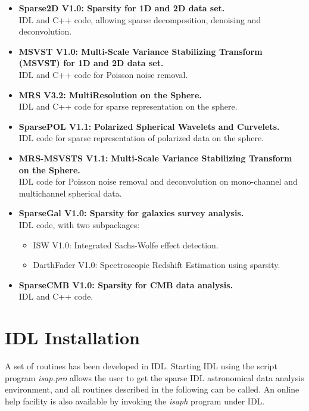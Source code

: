 \begin{itemize}
 \item{\Large \bf  {Sparse2D V1.0: }} {  \bf  {Sparsity for 1D and 2D data set. }} \\
 IDL and C++ code, allowing sparse decomposition, denoising and deconvolution.

 \item{\Large \bf  {MSVST V1.0: }} {  \bf  {Multi-Scale Variance Stabilizing Transform (MSVST) for 1D and 2D data set.}} \\
 IDL and C++ code for Poisson noise removal.
 
 \item{\Large \bf  {MRS V3.2: }} {  \bf  {MultiResolution on the Sphere.}} \\
  IDL and C++ code for sparse representation on the sphere.

 \item {\Large \bf  {SparsePOL V1.1:}}   {  \bf  {Polarized Spherical Wavelets and Curvelets.}}  \\
 IDL code for sparse representation of polarized data on the sphere.
 
 \item {\Large \bf {MRS-MSVSTS   V1.1:}}  { \bf  {Multi-Scale Variance Stabilizing Transform on the Sphere.}} \\
  IDL code for Poisson noise removal and deconvolution on mono-channel and multichannel spherical data.

  \item{\Large \bf  {SparseGal V1.0: }} {  \bf  {Sparsity for galaxies survey analysis.}} \\
 IDL code, with two subpackages:
 \begin{itemize}
 \item ISW V1.0:  Integrated Sachs-Wolfe effect detection.
 \item DarthFader V1.0: Spectroscopic Redshift Estimation using sparsity.
 \end{itemize}
  \item{\Large \bf  {SparseCMB V1.0: }} {  \bf  {Sparsity for CMB data analysis.}}  \\
 IDL and C++ code.
 \end{itemize}

\section{IDL Installation}

A set of routines has been developed in IDL. Starting IDL using the script program {\em isap.pro} allows the user 
to get the sparse IDL astronomical data analysis environment, and all routines described in the following can be called. 
An online help facility is also available by invoking the {\em isaph} program under IDL.

